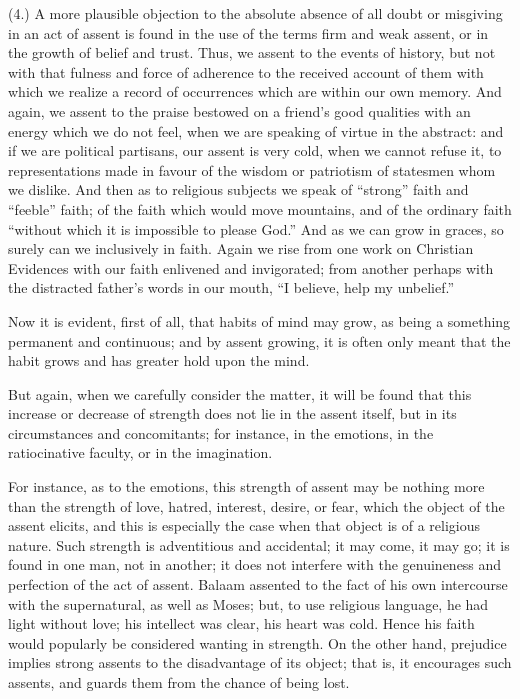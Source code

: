 (4.) A more plausible objection to the absolute absence of all
doubt or misgiving in an act of assent is found in the use of the
terms firm and weak assent, or in the growth of belief and trust.
Thus, we assent to the events of history, but not with that fulness
and force of adherence to the received account of them with which we
realize a record of occurrences which are within our own memory. And
again, we assent to the praise bestowed on a friend's good qualities
with an energy which we do not feel, when we are speaking of virtue in
the abstract: and if we are political partisans, our assent is very
cold, when we cannot refuse it, to representations made in favour of
the wisdom or patriotism of statesmen whom we dislike. And then as to
religious subjects we speak of ``strong'' faith and
``feeble'' faith; of the faith which would move mountains, and
of the ordinary faith ``without which it is impossible to please
God.'' And as we can grow in graces, so surely can we
inclusively in faith. Again we rise from one work on Christian
Evidences with our faith enlivened and invigorated; from another
perhaps with the distracted father's words in our mouth, ``I
believe, help my unbelief.''

Now it is evident, first of all, that habits of mind may grow, as
being a something permanent and continuous; and by assent growing, it
is often only meant that the habit grows and has greater hold upon the
mind.

But again, when we carefully consider the matter, it will be found
that this increase or decrease of strength does not lie in the assent
itself, but in its circumstances and concomitants; for instance, in
the emotions, in the ratiocinative faculty, or in the imagination.

For instance, as to the emotions, this strength of assent may be
nothing more than the strength of love, hatred, interest, desire, or
fear, which the object of the assent elicits, and this is especially
the case when that object is of a religious nature. Such strength is
adventitious and accidental; it may come, it may go; it is found in
one man, not in another; it does not interfere with the genuineness
and perfection of the act of assent. Balaam assented to the fact of
his own intercourse with the supernatural, as well as Moses; but, to
use religious language, he had light without love; his intellect was
clear, his heart was cold. Hence his faith would popularly be
considered wanting in strength. On the other hand, prejudice implies
strong assents to the disadvantage of its object; that is, it
encourages such assents, and guards them from the chance of being
lost.


